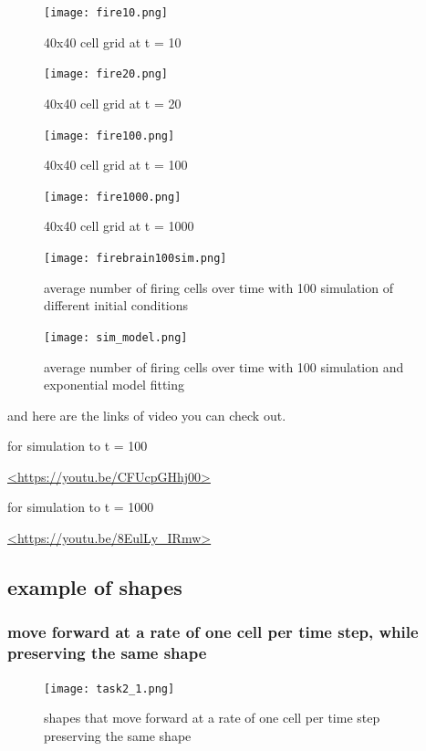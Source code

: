 \documentclass[12pt]{article}
\begin{document}
{\begin{figure}[H] %
\centering
\texttt{[image: fire10.png]}
\caption{40x40 cell grid at t = 10}
\label{fig:fire10}
\end{figure}

\begin{figure}[H] %
\centering
\texttt{[image: fire20.png]}
\caption{40x40 cell grid at t = 20}
\label{fig:fire20}
\end{figure}

\begin{figure}[H] %
\centering
\texttt{[image: fire100.png]}
\caption{40x40 cell grid at t = 100}
\label{fig:fire100}
\end{figure}

\begin{figure}[H] %
\centering
\texttt{[image: fire1000.png]}
\caption{40x40 cell grid at t = 1000}
\label{fig:fire1000}
\end{figure}

\begin{figure}[H] %
\centering
\texttt{[image: firebrain100sim.png]}
\caption{average number of firing cells over time with 100 simulation of different initial conditions}
\label{fig:100sim}
\end{figure}

\begin{figure}[H] %
\centering
\texttt{[image: sim\_model.png]}
\caption{average number of firing cells over time with 100 simulation and exponential model fitting}
\label{fig:sim_model}
\end{figure}

and here are the links of video you can check out.\par 
for simulation to t = 100\par
\url{<https://youtu.be/CFUcpGHhj00>}\par
for simulation to t = 1000\par
\url{<https://youtu.be/8EulLy_IRmw>}\par




\subsection{example of shapes}

\subsubsection{move forward at a rate of one cell per time step, while preserving the same shape}
\begin{figure}[H] %
\centering
\texttt{[image: task2\_1.png]}
\caption{shapes that move forward at a rate of one cell per time step preserving the same shape}
\label{fig:task2_1}
\end{figure}

}
\end{document}
